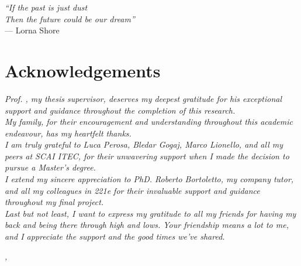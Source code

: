 \cleardoublepage
{}
{}

\begin{flushright}{
    \slshape
    ``If the past is just dust\\ Then the future could be our dream''} \\
    \medskip
    --- Lorna Shore 
\end{flushright}


\bigskip

\begingroup
\let\clearpage\relax
\let\cleardoublepage\relax
\let\cleardoublepage\relax

\chapter{Acknowledgements}

\noindent \textit{Prof. \myProf, my thesis supervisor, deserves my deepest gratitude for his exceptional support and guidance throughout the completion of this research.}\\
\noindent \textit{My family, for their encouragement and understanding throughout this academic endeavour, has my heartfelt thanks.}\\
\noindent \textit{I am truly grateful to Luca Perosa, Bledar Gogaj, Marco Lionello, and all my peers at SCAI ITEC, for their unwavering support when I made the decision to pursue a Master’s degree.}\\
\noindent \textit{I extend my sincere appreciation to PhD. Roberto Bortoletto, my company tutor, and all my colleagues in 221e for their invaluable support and guidance throughout my final project.}\\
\noindent \textit{Last but not least, I want to express my gratitude to all my friends for having my back and being there through high and lows. Your friendship means a lot to me, and I appreciate the support and the good times we've shared.}\\
\bigskip

\noindent\textit{\myLocation, \myTime}
\hfill \myName

\endgroup
